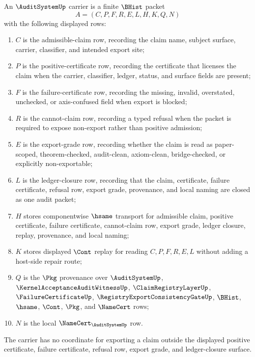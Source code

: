 \begin{definition}
\label{def:audit-system-carrier}
An $\AuditSystemUp$ carrier is a finite $\BHist$ packet
$$
A=(C,P,F,R,E,L,H,K,Q,N)
$$
with the following displayed rows:
\begin{enumerate}
\item $C$ is the admissible-claim row, recording the claim name, subject surface, carrier, classifier, and intended export site;
\item $P$ is the positive-certificate row, recording the certificate that licenses the claim when the carrier, classifier, ledger, status, and surface fields are present;
\item $F$ is the failure-certificate row, recording the missing, invalid, overstated, unchecked, or axis-confused field when export is blocked;
\item $R$ is the cannot-claim row, recording a typed refusal when the packet is required to expose non-export rather than positive admission;
\item $E$ is the export-grade row, recording whether the claim is read as paper-scoped, theorem-checked, audit-clean, axiom-clean, bridge-checked, or explicitly non-exportable;
\item $L$ is the ledger-closure row, recording that the claim, certificate, failure certificate, refusal row, export grade, provenance, and local naming are closed as one audit packet;
\item $H$ stores componentwise $\hsame$ transport for admissible claim, positive certificate, failure certificate, cannot-claim row, export grade, ledger closure, replay, provenance, and local naming;
\item $K$ stores displayed $\Cont$ replay for reading $C,P,F,R,E,L$ without adding a host-side repair route;
\item $Q$ is the $\Pkg$ provenance over $\AuditSystemUp$, $\KernelAcceptanceAuditWitnessUp$, $\ClaimRegistryLayerUp$, $\FailureCertificateUp$, $\RegistryExportConsistencyGateUp$, $\BHist$, $\hsame$, $\Cont$, $\Pkg$, and $\NameCert$ rows;
\item $N$ is the local $\NameCert_{\AuditSystemUp}$ row.
\end{enumerate}
The carrier has no coordinate for exporting a claim outside the displayed positive certificate, failure certificate, refusal row, export grade, and ledger-closure surface.
\end{definition}

